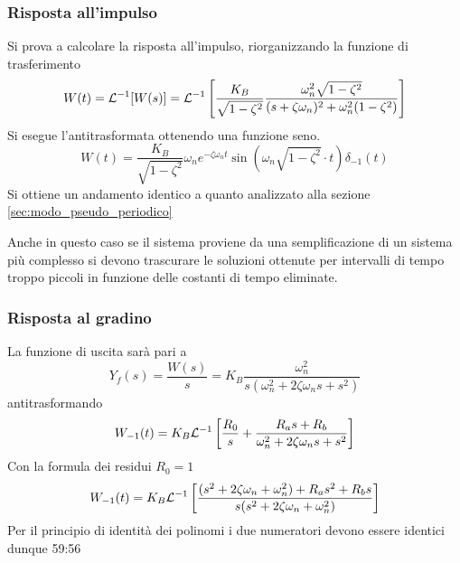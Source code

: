 \subsubsection{Risposta all'impulso}
Si prova a calcolare la risposta all'impulso, riorganizzando la funzione di
trasferimento
$$
W(t) = \mathcal{L}^{-1}[W(s)] =
\mathcal{L}^{-1}\left[\frac{K_B}{\sqrt{1-\zeta^2}}\frac{\omega_n^2
\sqrt{1-\zeta^2}}{(s+\zeta\omega_n)^2+\omega_n^2(1-\zeta^2 ) } \right]
$$
Si esegue l'antitrasformata ottenendo una funzione seno.
$$
W(t) = \frac{K_B}{\sqrt{1-\zeta^2}}\omega_n e^{-\zeta\omega_n t}
\sin\left(\omega_n\sqrt{1-\zeta^2}\cdot t\right)\delta_{-1}(t)
$$
\newpage
Si ottiene un andamento identico a quanto analizzato alla sezione
\ref{sec:modo_pseudo_periodico}
\begin{figure}[h]
\centering
\end{figure}
Anche in questo caso se il sistema proviene da una semplificazione di un
sistema più complesso si devono trascurare le soluzioni ottenute per intervalli
di tempo troppo piccoli in funzione delle costanti di tempo eliminate.

\subsubsection{Risposta al gradino}
La funzione di uscita sarà pari a
$$
Y_f(s) = \frac{W(s)}{s} = K_B\frac{\omega_n^2}{s(\omega_n^2 + 2\zeta\omega_n s
+s^2)}
$$
antitrasformando
$$
W_{-1}(t) = K_B \mathcal{L}^{-1} \left[\frac{R_0}{s} + \frac{R_as+R_b}
{\omega_n^2 +2\zeta\omega_n s+s^2}\right]
$$
Con la formula dei residui $R_0=1$
$$
W_{-1}(t) = K_B \mathcal{L}^{-1} \left[\frac{(s^2+2\zeta\omega_n+\omega_n^2)
+R_as^2+R_bs}
{s(s^2+2\zeta\omega_n+\omega_n^2)}\right]
$$
Per il principio di identità dei polinomi i due numeratori devono essere
identici dunque 59:56
